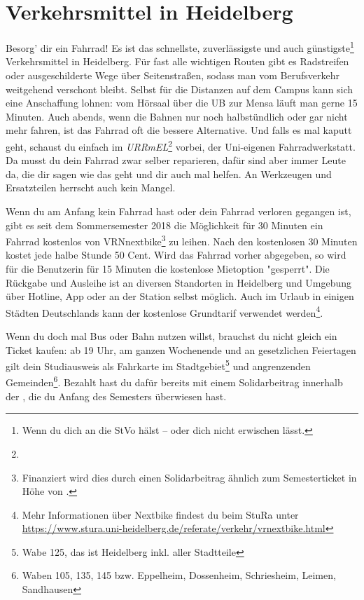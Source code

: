 \section{Verkehrsmittel in Heidelberg}
\label{verkehrsmittel}

Besorg' dir ein Fahrrad! Es ist das schnellste, zuverlässigste und auch günstigste\footnote{Wenn du dich an die StVo hälst -- oder dich nicht erwischen lässt.} Verkehrsmittel in Heidelberg. Für fast alle wichtigen Routen gibt es Radstreifen oder ausgeschilderte Wege über Seitenstraßen, sodass man vom Berufsverkehr weitgehend verschont bleibt. Selbst für die Distanzen auf dem Campus kann sich eine Anschaffung lohnen: vom Hörsaal über die \gls{UB} zur Mensa läuft man gerne 15 Minuten. Auch abends, wenn die Bahnen nur noch halbstündlich oder gar nicht mehr fahren, ist das Fahrrad oft die bessere Alternative. Und falls es mal kaputt geht, schaust du einfach im \emph{URRmEL}\footnote{\urrmelOeff} vorbei, der Uni-eigenen Fahrradwerkstatt. Da musst du dein Fahrrad zwar selber reparieren, dafür sind aber immer Leute da, die dir sagen wie das geht und dir auch mal helfen. An Werkzeugen und Ersatzteilen herrscht auch kein Mangel.

\label{nextbike}
Wenn du am Anfang kein Fahrrad hast oder dein Fahrrad verloren gegangen ist, gibt es seit dem Sommersemester 2018 die Möglichkeit für 30 Minuten ein Fahrrad kostenlos von VRNnextbike\footnote{Finanziert wird dies durch einen Solidarbeitrag ähnlich zum Semesterticket in Höhe von .} zu leihen. Nach den kostenlosen 30 Minuten kostet jede halbe Stunde 50 Cent. Wird das Fahrrad vorher abgegeben, so wird für die Benutzerin für 15 Minuten die kostenlose Mietoption "gesperrt". Die Rückgabe und Ausleihe ist an diversen Standorten in Heidelberg und Umgebung über Hotline, App oder an der Station selbst möglich. Auch im Urlaub in einigen Städten Deutschlands kann der kostenlose Grundtarif verwendet werden\footnote{Mehr Informationen über Nextbike findest du beim StuRa unter \url{https://www.stura.uni-heidelberg.de/referate/verkehr/vrnextbike.html}}.

Wenn du doch mal Bus oder Bahn nutzen willst, brauchst du nicht gleich ein Ticket kaufen: ab 19 Uhr, am ganzen Wochenende und an gesetzlichen Feiertagen gilt dein Studiausweis als Fahrkarte im Stadtgebiet\footnote{Wabe 125, das ist Heidelberg inkl. aller Stadtteile} und angrenzenden Gemeinden\footnote{Waben 105, 135, 145 bzw. Eppelheim, Dossenheim, Schriesheim, Leimen, Sandhausen}. Bezahlt hast du dafür bereits mit einem Solidarbeitrag innerhalb der \EUR{\beitragssumme}, die du Anfang des Semesters überwiesen hast.

